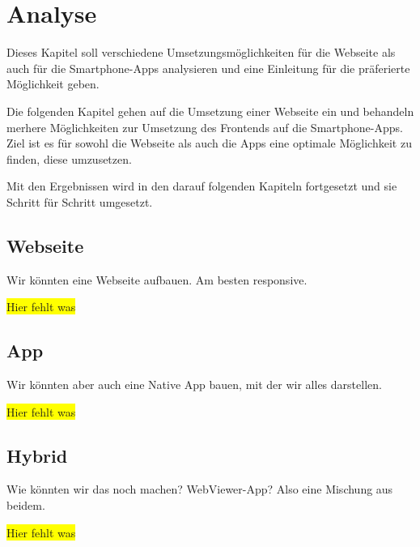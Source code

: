 \section{Analyse}
Dieses Kapitel soll verschiedene Umsetzungsmöglichkeiten für die Webseite als auch für die Smartphone-Apps analysieren
und eine Einleitung für die präferierte Möglichkeit geben.

Die folgenden Kapitel gehen auf die Umsetzung einer Webseite ein und behandeln merhere Möglichkeiten zur Umsetzung des
Frontends auf die Smartphone-Apps. Ziel ist es für sowohl die Webseite als auch die Apps eine optimale Möglichkeit
zu finden, diese umzusetzen.

Mit den Ergebnissen wird in den darauf folgenden Kapiteln fortgesetzt und sie Schritt für Schritt umgesetzt.

\subsection{Webseite}
Wir könnten eine Webseite aufbauen. Am besten responsive.

\colorbox{yellow}{Hier fehlt was}

\subsection{App}
Wir könnten aber auch eine Native App bauen, mit der wir alles darstellen.

\colorbox{yellow}{Hier fehlt was}

\subsection{Hybrid}
Wie könnten wir das noch machen? WebViewer-App? Also eine Mischung aus beidem.

\colorbox{yellow}{Hier fehlt was}